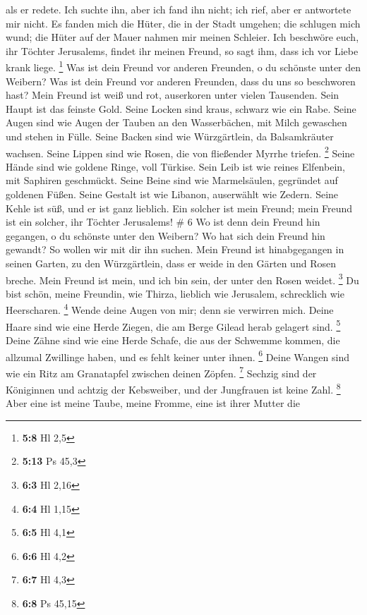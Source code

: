 als er redete. Ich suchte ihn, aber ich fand ihn nicht; ich rief, aber
er antwortete mir nicht.  Es fanden mich die Hüter, die in
der Stadt umgehen; die schlugen mich wund; die Hüter auf der Mauer
nahmen mir meinen Schleier.  Ich beschwöre euch, ihr Töchter
Jerusalems, findet ihr meinen Freund, so sagt ihm, dass ich vor Liebe
krank liege. \footnote{\textbf{5:8} Hl 2,5}  Was ist dein
Freund vor anderen Freunden, o du schönste unter den Weibern? Was ist
dein Freund vor anderen Freunden, dass du uns so beschworen hast?
 Mein Freund ist weiß und rot, auserkoren unter vielen
Tausenden.  Sein Haupt ist das feinste Gold. Seine Locken
sind kraus, schwarz wie ein Rabe.  Seine Augen sind wie
Augen der Tauben an den Wasserbächen, mit Milch gewaschen und stehen in
Fülle.  Seine Backen sind wie Würzgärtlein, da
Balsamkräuter wachsen. Seine Lippen sind wie Rosen, die von fließender
Myrrhe triefen. \footnote{\textbf{5:13} Ps 45,3}  Seine
Hände sind wie goldene Ringe, voll Türkise. Sein Leib ist wie reines
Elfenbein, mit Saphiren geschmückt.  Seine Beine sind wie
Marmelsäulen, gegründet auf goldenen Füßen. Seine Gestalt ist wie
Libanon, auserwählt wie Zedern.  Seine Kehle ist süß, und
er ist ganz lieblich. Ein solcher ist mein Freund; mein Freund ist ein
solcher, ihr Töchter Jerusalems! \# 6  Wo ist denn dein
Freund hin gegangen, o du schönste unter den Weibern? Wo hat sich dein
Freund hin gewandt? So wollen wir mit dir ihn suchen.  Mein
Freund ist hinabgegangen in seinen Garten, zu den Würzgärtlein, dass er
weide in den Gärten und Rosen breche.  Mein Freund ist mein,
und ich bin sein, der unter den Rosen weidet. \footnote{\textbf{6:3} Hl
  2,16}  Du bist schön, meine Freundin, wie Thirza, lieblich
wie Jerusalem, schrecklich wie Heerscharen. \footnote{\textbf{6:4} Hl
  1,15}  Wende deine Augen von mir; denn sie verwirren mich.
Deine Haare sind wie eine Herde Ziegen, die am Berge Gilead herab
gelagert sind. \footnote{\textbf{6:5} Hl 4,1}  Deine Zähne
sind wie eine Herde Schafe, die aus der Schwemme kommen, die allzumal
Zwillinge haben, und es fehlt keiner unter ihnen. \footnote{\textbf{6:6}
  Hl 4,2}  Deine Wangen sind wie ein Ritz am Granatapfel
zwischen deinen Zöpfen. \footnote{\textbf{6:7} Hl 4,3} 
Sechzig sind der Königinnen und achtzig der Kebsweiber, und der
Jungfrauen ist keine Zahl. \footnote{\textbf{6:8} Ps 45,15} 
Aber eine ist meine Taube, meine Fromme, eine ist ihrer Mutter die
